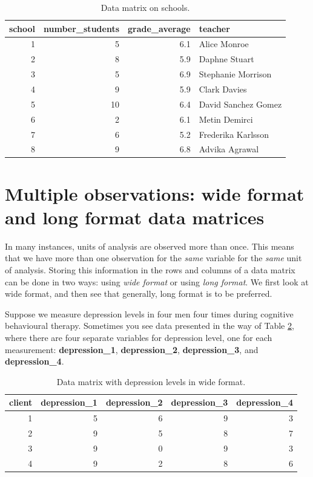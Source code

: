 \documentclass[]{book}\usepackage[]{graphicx}\usepackage[]{color}
\begin{document}
\begin{table}[ht]
\centering
\caption{Data matrix on schools.} 
\label{tab:data_3}
\begin{tabular}{rrrl}
  \hline
school & number\_students & grade\_average & teacher \\ 
  \hline
1 & 5 & 6.1 & Alice Monroe \\ 
  2 & 8 & 5.9 & Daphne Stuart \\ 
  3 & 5 & 6.9 & Stephanie Morrison \\ 
  4 & 9 & 5.9 & Clark Davies \\ 
  5 & 10 & 6.4 & David Sanchez Gomez \\ 
  6 & 2 & 6.1 & Metin Demirci \\ 
  7 & 6 & 5.2 & Frederika Karlsson \\ 
  8 & 9 & 6.8 & Advika Agrawal \\ 
   \hline
\end{tabular}
\end{table}



\section{Multiple observations: wide format and long format data matrices}

In many instances, units of analysis are observed more than once. This means that we have more than one observation for the \textit{same} variable for the \textit{same} unit of analysis. Storing this information in the rows and columns of a data matrix can be done in two ways: using \textit{wide format} or using \textit{long format}. We first look at wide format, and then see that generally, long format is to be preferred.

Suppose we measure depression levels in four men four times during cognitive behavioural therapy. Sometimes you see data presented in the way of Table \ref{tab:data_7}, where there are four separate variables for depression level, one for each measurement: \textbf{depression\_1}, \textbf{depression\_2}, \textbf{depression\_3}, and \textbf{depression\_4}.

\begin{table}[ht]
\centering
\caption{Data matrix with depression levels in wide format.} 
\label{tab:data_7}
\begin{tabular}{rrrrr}
  \hline
client & depression\_1 & depression\_2 & depression\_3 & depression\_4 \\ 
  \hline
1 & 5 & 6 & 9 & 3 \\ 
  2 & 9 & 5 & 8 & 7 \\ 
  3 & 9 & 0 & 9 & 3 \\ 
  4 & 9 & 2 & 8 & 6 \\ 
   \hline
\end{tabular}
\end{table}
\end{document}

